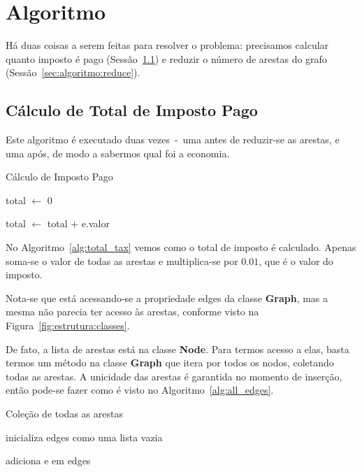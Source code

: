 \documentclass[12pt]{article}
\begin{document}
\section{Algoritmo}\label{sec:algoritmo}

Há duas coisas a serem feitas para resolver o problema: precisamos calcular
quanto imposto é pago (Sessão~\ref{sec:algoritmo:total_tax}) e reduzir o número
de arestas do grafo (Sessão~\ref{sec:algoritmo:reduce}).

\subsection{Cálculo de Total de Imposto Pago}\label{sec:algoritmo:total_tax}

Este algoritmo é executado duas vezes~-~uma antes de reduzir-se as arestas, e
uma após, de modo a sabermos qual foi a economia.

\begin{algorithm}[H]
  \caption{Cálculo de Imposto Pago}
  \label{alg:total_tax}
  total $\gets$ $0$

  {
    total $\gets$ total $+$ e.valor
  }
\end{algorithm}

No Algoritmo~\ref{alg:total_tax} vemos como o total de imposto é
calculado. Apenas soma-se o valor de todas as arestas e multiplica-se por
$0.01$, que é o valor do imposto.

Nota-se que está acessando-se a propriedade \textsf{edges} da classe
\textsf{\textbf{Graph}}, mas a mesma não parecia ter acesso às arestas, conforme
visto na Figura~\ref{fig:estrutura:classes}.

De fato, a lista de arestas está na classe \textsf{\textbf{Node}}. Para termos
acesso a elas, basta termos um método na classe \textsf{\textbf{Graph}} que
itera por todos os nodos, coletando todas as arestas. A unicidade das arestas é
garantida no momento de inserção, então pode-se fazer como é visto no Algoritmo~\ref{alg:all_edges}.

\begin{algorithm}[H]
  \caption{Coleção de todas as arestas}
  \label{alg:all_edges}
  inicializa edges como uma lista vazia

  {
    {
      adiciona e em edges
    }
  }

\end{algorithm}
\end{document}
